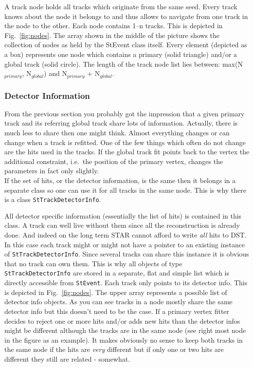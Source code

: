 \documentclass[twoside]{article}
\begin{document}
A track node holds all tracks which originate from the same seed.
Every track knows about the node it belongs to and thus allows to
navigate from one track in the node to the other.  Each node contains
1--n tracks. This is depicted in Fig.~\ref{fig:nodes}.  The array
shown in the middle of the picture shows the collection of nodes as
held by the StEvent class itself. Every element (depicted as a box)
represents one node which contains a primary (solid triangle) and/or a
global track (solid circle). The length of the track node list lies
between: max(N$_{primary}$, N$_{global}$) and N$_{primary}$ +
N$_{global}$.

\subsubsection{Detector Information}
\label{sec:detInfo}
From the previous section you probably got the impression that a given
primary track and its referring global track share lots of
information.  Actually, there is much less to share then one might
think.  Almost everything changes or can change when a track is
refitted. One of the few things which often do not change are the hits
used in the tracks.  If the global track fit points back to the vertex
the additional constraint, i.e.~the position of the primary
vertex, changes the parameters in fact only slightly. \\
If the set of hits, or the detector information, is the same then it
belongs in a separate class so one can use it for all tracks in the
same node.  This is why there is a class \texttt{StTrackDetectorInfo}.
 
All detector specific information (essentially the list of hits) is
contained in this class.  A track can well live without them since all
the reconstruction is already done.  And indeed on the long term STAR
cannot afford to write \emph{all} hits to DST. In this case each track
might or might not have a pointer to an existing instance of
\texttt{StTrackDetectorInfo}.  Since several tracks can share this
instance it is obvious that no track can own them. This is why all
objects of type \texttt{StTrackDetectorInfo} are stored in a separate,
flat and simple list which is directly accessible from
\texttt{StEvent}. Each track only points to its detector info. This is
depicted in Fig.~\ref{fig:nodes}.  The upper array represents a
possible list of detector info objects.  As you can see tracks in a
node mostly share the same detector info but this doesn't need to be
the case. If a primary vertex fitter decides to reject one or more
hits and/or adds new hits than the detector infos might be different
although the tracks are in the same node (see right most node in the
figure as an example). It makes obviously no sense to keep both tracks
in the same node if the hits are \emph{very} different but if only one
or two hits are different they still are related - somewhat.
\end{document}
